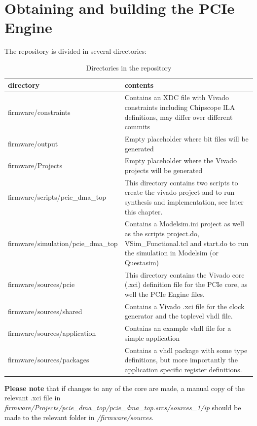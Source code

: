 \section{Obtaining and building the PCIe Engine}
The repository is divided in several directories:
\begin{table}[H]
	\centering
	\begin{tabularx}{\textwidth}{|l|X|}
	\hline
	\textbf{directory}&\textbf{contents}\\
	\hline
	firmware/constraints&Contains an XDC file with Vivado constraints including Chipscope ILA definitions, may differ over different commits\\
	\hline
	firmware/output&Empty placeholder where bit files will be generated\\
	\hline
	firmware/Projects&Empty placeholder where the Vivado projects will be generated\\
	\hline
	firmware/scripts/pcie\_dma\_top&This directory contains two scripts to create the vivado project and to run synthesis and implementation, see later this chapter.\\
	\hline
	firmware/simulation/pcie\_dma\_top&Contains a Modelsim.ini project as well as the scripts project.do, VSim\_Functional.tcl and start.do to run the simulation in Modelsim (or Questasim)\\
	\hline
	firmware/sources/pcie&This directory contains the Vivado core (.xci) definition file for the PCIe core, as well the PCIe Engine files.\\
	\hline
	firmware/sources/shared&Contains a Vivado .xci file for the clock generator and the toplevel vhdl file.\\
	\hline
	firmware/sources/application&Contains an example vhdl file for a simple application\\
	\hline
	firmware/sources/packages&Contains a vhdl package with some type definitions, but more importantly the application specific register definitions.\\
	\hline		
	
	\end{tabularx}
	\caption{Directories in the repository}\label{tab:directories}
\end{table}

\textbf{Please note} that if changes to any of the core are made, a manual copy of the relevant .xci file in \textit{firmware/Projects/pcie\_dma\_top/pcie\_dma\_top.srcs/sources\_1/ip} should be made to the relevant folder in \textit{/firmware/sources}.

